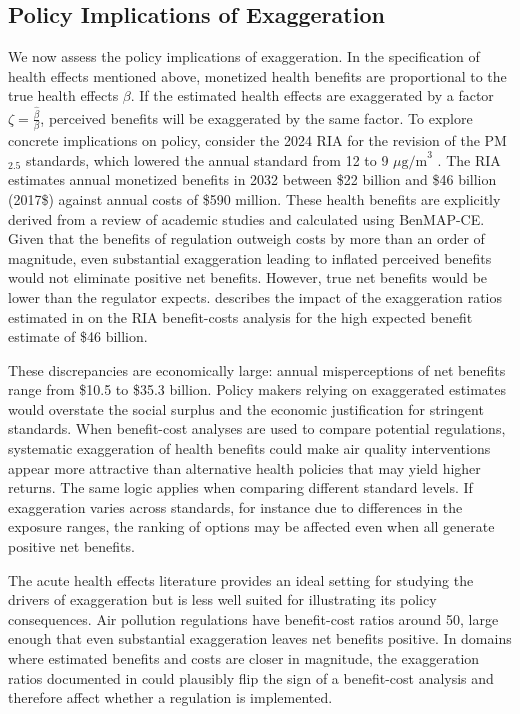 \documentclass[12pt]{article}
\begin{document}
	\subsection{Policy Implications of Exaggeration}
		
		We now assess the policy implications of exaggeration. In the specification of health effects mentioned above, monetized health benefits are proportional to the true health effects $\beta$. If the estimated health effects are exaggerated by a factor $\zeta = \frac{\hat{\beta}}{\beta}$, perceived benefits will be exaggerated by the same factor. To explore concrete implications on policy, consider the 2024 RIA for the revision of the PM$_{2.5}$ standards, which lowered the annual standard from 12 to 9 $\mu\text{g/m}^3$ \citep{u.s.epa_final_2024}. The RIA estimates annual monetized benefits in 2032 between \$22 billion and \$46 billion (2017\$) against annual costs of \$590 million.  %
		These health benefits are explicitly derived from a review of academic studies and calculated using BenMAP-CE.  %
		Given that the benefits of regulation outweigh costs by more than an order of magnitude, even substantial exaggeration leading to inflated perceived benefits would not eliminate positive net benefits. However, true net benefits would be lower than the regulator expects.  describes the impact of the exaggeration ratios estimated in  on the RIA benefit-costs analysis for the high expected benefit estimate of \$46 billion.
		
		
		
		These discrepancies are economically large: annual misperceptions of net benefits range from \$10.5 to \$35.3 billion. Policy makers relying on exaggerated estimates would overstate the social surplus and the economic justification for stringent standards. When benefit-cost analyses are used to compare potential regulations, systematic exaggeration of health benefits could make air quality interventions appear more attractive than alternative health policies that may yield higher returns. The same logic applies when comparing different standard levels. If exaggeration varies across standards, for instance due to differences in the exposure ranges, the ranking of options may be affected even when all generate positive net benefits.
		
		The acute health effects literature provides an ideal setting for studying the drivers of exaggeration but is less well suited for illustrating its policy consequences. Air pollution regulations have benefit-cost ratios around 50, large enough that even substantial exaggeration leaves net benefits positive. In domains where estimated benefits and costs are closer in magnitude, the exaggeration ratios documented in  could plausibly flip the sign of a benefit-cost analysis and therefore affect whether a regulation is implemented.
		
\end{document}

